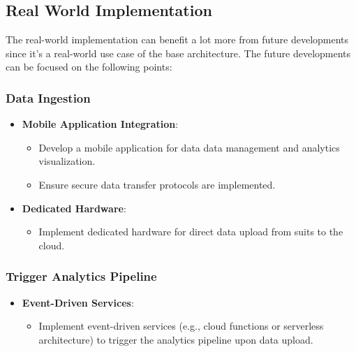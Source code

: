 \subsection{Real World Implementation}

The real-world implementation can benefit a lot more from future developments since it's a real-world use case of the base architecture. The future developments can be focused on the following points:

\subsubsection{Data Ingestion}
\begin{itemize}
    \item \textbf{Mobile Application Integration}:
        \begin{itemize}
            \item Develop a mobile application for data data management and analytics visualization.
            \item Ensure secure data transfer protocols are implemented.
        \end{itemize}
    \item \textbf{Dedicated Hardware}:
        \begin{itemize}
            \item Implement dedicated hardware for direct data upload from suits to the cloud.
        \end{itemize}
\end{itemize}

\subsubsection{Trigger Analytics Pipeline}
\begin{itemize}
    \item \textbf{Event-Driven Services}:
        \begin{itemize}
            \item Implement event-driven services (e.g., cloud functions or serverless architecture) to trigger the analytics pipeline upon data upload.
        \end{itemize}
\end{itemize}

